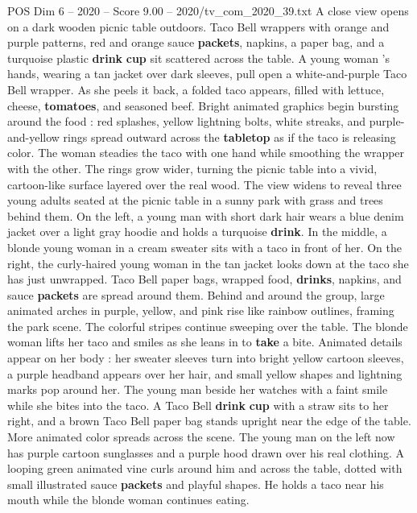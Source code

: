 \begin{textsample}{POS Dim 6 – 2020 – Score 9.00 – 2020/tv\_com\_2020\_39.txt}  \label{ex:f6_pos_064}
A close view opens on a dark wooden picnic table outdoors.
Taco Bell wrappers with orange and purple patterns, red and orange sauce \textbf{packets}, napkins, a paper bag, and a turquoise plastic \textbf{drink} \textbf{cup} sit scattered across the table.
A young woman ’s hands, wearing a tan jacket over dark sleeves, pull open a white-and-purple Taco Bell wrapper.
As she peels it back, a folded taco appears, filled with lettuce, cheese, \textbf{tomatoes}, and seasoned beef.
Bright animated graphics begin bursting around the food : red splashes, yellow lightning bolts, white streaks, and purple-and-yellow rings spread outward across the \textbf{tabletop} as if the taco is releasing color.
The woman steadies the taco with one hand while smoothing the wrapper with the other.
The rings grow wider, turning the picnic table into a vivid, cartoon-like surface layered over the real wood.
The view widens to reveal three young adults seated at the picnic table in a sunny park with grass and trees behind them.
On the left, a young man with short dark hair wears a blue denim jacket over a light gray hoodie and holds a turquoise \textbf{drink}.
In the middle, a blonde young woman in a cream sweater sits with a taco in front of her.
On the right, the curly-haired young woman in the tan jacket looks down at the taco she has just unwrapped.
Taco Bell paper bags, wrapped food, \textbf{drinks}, napkins, and sauce \textbf{packets} are spread around them.
Behind and around the group, large animated arches in purple, yellow, and pink rise like rainbow outlines, framing the park scene.
The colorful stripes continue sweeping over the table.
The blonde woman lifts her taco and smiles as she leans in to \textbf{take} a bite.
Animated details appear on her body : her sweater sleeves turn into bright yellow cartoon sleeves, a purple headband appears over her hair, and small yellow shapes and lightning marks pop around her.
The young man beside her watches with a faint smile while she bites into the taco.
A Taco Bell \textbf{drink} \textbf{cup} with a straw sits to her right, and a brown Taco Bell paper bag stands upright near the edge of the table.
More animated color spreads across the scene.
The young man on the left now has purple cartoon sunglasses and a purple hood drawn over his real clothing.
A looping green animated vine curls around him and across the table, dotted with small illustrated sauce \textbf{packets} and playful shapes.
He holds a taco near his mouth while the blonde woman continues eating.

\end{textsample}
